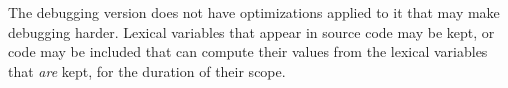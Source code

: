 The debugging version does not have optimizations applied to it that
may make debugging harder.  Lexical variables that appear in source
code may be kept, or code may be included that can compute their
values from the lexical variables that \emph{are} kept, for the
duration of their scope.


